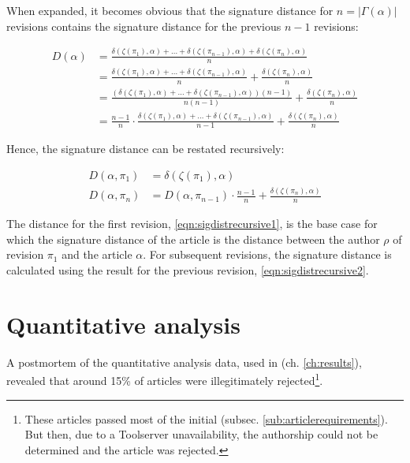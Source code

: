 When expanded, it becomes obvious that the signature distance for $n = |\Gamma(\alpha)|$ revisions contains the signature distance for the previous $n-1$ revisions:
 
\begin{align*}
D(\alpha) &=  \frac{\delta(\zeta(\pi_{1}),\alpha)  + \ldots + \delta(\zeta(\pi_{n-1}),\alpha) + \delta(\zeta(\pi_{n}),\alpha)}{n} \\
 &=  \frac{\delta(\zeta(\pi_{1}),\alpha)  + \ldots + \delta(\zeta(\pi_{n-1}),\alpha)}{n} + \frac{\delta(\zeta(\pi_{n}),\alpha)}{n} \\
 &=  \frac{(\delta(\zeta(\pi_{1}),\alpha)  + \ldots + \delta(\zeta(\pi_{n-1}),\alpha))(n-1)}{n(n-1)} + \frac{\delta(\zeta(\pi_{n}),\alpha)}{n} \\
 &=  \frac{n-1}{n} \cdot \frac{\delta(\zeta(\pi_{1}),\alpha)  + \ldots + \delta(\zeta(\pi_{n-1}),\alpha)}{n-1} + \frac{\delta(\zeta(\pi_{n}),\alpha)}{n} 
\end{align*}

Hence, the signature distance can be restated recursively:

\begin{align}
D(\alpha, \pi_{1}) &= \delta(\zeta(\pi_{1}),\alpha)\label{eqn:sigdistrecursive1}\\
D(\alpha, \pi_{n}) &=  D(\alpha, \pi_{n-1}) \cdot \frac{n-1}{n} + \frac{\delta(\zeta(\pi_{n}),\alpha)}{n} \label{eqn:sigdistrecursive2}
\end{align}

The distance for the first revision, \ref{eqn:sigdistrecursive1}, is the base case for which the signature distance of the article is the distance between the author $\rho$ of revision $\pi_{1}$ and the article $\alpha$.
For subsequent revisions, the signature distance is calculated using the result for the previous revision, \ref{eqn:sigdistrecursive2}.


\section{Quantitative analysis}

A postmortem of the quantitative analysis data, used in  (ch. \ref{ch:results}), revealed that around 15\% of articles were illegitimately rejected\footnote{These articles passed most of the initial  (subsec. \ref{sub:articlerequirements}). But then, due to a Toolserver unavailability, the authorship could not be determined and the article was rejected.}.

